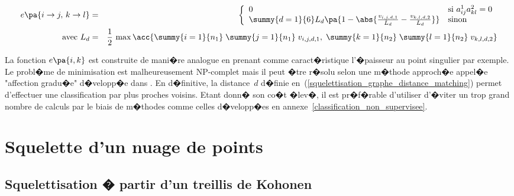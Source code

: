         \begin{eqnarray}
        e\pa{i \rightarrow j, \, k \rightarrow l} &=& \left \{ \begin{array}{ll}
                                            0 & \text{si } a_{ij}^1 a_{kl}^2 = 0 \\
                                            \summy{d=1}{6} L_d \pa{ 1 - \abs{  \frac{v_{i,j,d,1}}{L_d} - \frac{v_{k,l,d,2}}{L_d} }}
                                                    & \text{sinon }
                                            \end{array} \right. \\
        \text{avec } L_d &=&     \frac{1}{2} \, \max \acc{ 
                                                    \summy{i=1}{n_1} \; \summy{j=1}{n_1} \; v_{i,j,d,1}, \;
                                                    \summy{k=1}{n_2} \; \summy{l=1}{n_2} \; v_{k,l,d,2}  }
                \nonumber
        \end{eqnarray}



La fonction $e\pa{i,k}$ est construite de mani�re analogue en prenant comme caract�ristique l'�paisseur au point singulier par exemple. Le probl�me de minimisation est malheureusement NP-complet mais il peut �tre r�solu selon une m�thode approch�e appel�e "affection gradu�e" d�velopp�e dans . En d�finitive, la distance~$d$ d�finie en~(\ref{squelettisation_graphe_distance_matching}) permet d'effectuer une classification par plus proches voisins. Etant donn� son co�t �lev�, il est pr�f�rable d'utiliser d'�viter un trop grand nombre de calculs par le biais de m�thodes comme celles d�velopp�es en annexe~\ref{classification_non_supervisee}.






\section{Squelette d'un nuage de points}
\label{ske_nuage_point_squelette}

\subsection{Squelettisation � partir d'un treillis de Kohonen}


